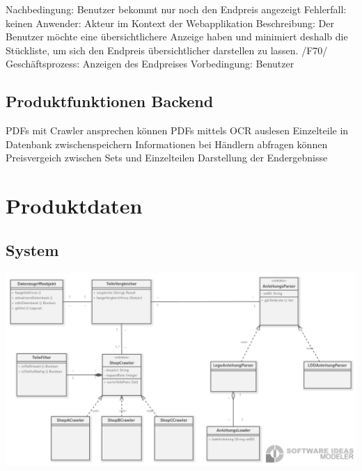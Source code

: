 Nachbedingung: Benutzer bekommt nur noch den Endpreis angezeigt\newline
Fehlerfall: keinen\newline
Anwender: Akteur im Kontext der Webapplikation \newline
Beschreibung: Der Benutzer möchte eine übersichtlichere Anzeige haben und minimiert deshalb die Stückliste, um sich den Endpreis übersichtlicher darstellen zu lassen.\newline\newline
/F70/\newline
Geschäftsprozess: Anzeigen des Endpreises \newline
Vorbedingung: Benutzer \newline

\subsection{Produktfunktionen Backend} 
PDFs mit Crawler ansprechen können \newline
PDFs mittels OCR auslesen \newline
Einzelteile in Datenbank zwischenspeichern \newline
Informationen bei Händlern abfragen können \newline
Preisvergeich zwischen Sets und Einzelteilen \newline
Darstellung der Endergebnisse \newline

\section{Produktdaten}
\subsection{System}
\includegraphics[width=18cm]{pictures/Architektur_Klassendiagramm.png}


